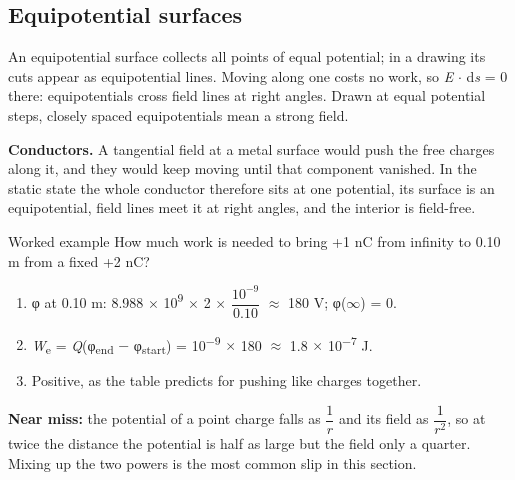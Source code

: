 \documentclass[11pt]{article}
\begin{document}
\begin{keepsection}
\begin{keepsection}
\subsection{Equipotential surfaces}

An equipotential surface collects all points of equal potential; in a drawing its cuts appear as equipotential lines. Moving along one costs no work, so \textit{E} \ensuremath{\cdot} d\textit{s} = 0 there: equipotentials cross field lines at right angles. Drawn at equal potential steps, closely spaced equipotentials mean a strong field.

\textbf{Conductors.} A tangential field at a metal surface would push the free charges along it, and they would keep moving until that component vanished. In the static state the whole conductor therefore sits at one potential, its surface is an equipotential, field lines meet it at right angles, and the interior is field-free.

\begin{workedbox}{Worked example}
How much work is needed to bring +1 nC from infinity to 0.10 m from a fixed +2 nC?

\begin{enumerate}
\item φ at 0.10 m: 8.988 \ensuremath{\times} 10\textsuperscript{9} \ensuremath{\times} 2 \ensuremath{\times} {\small\ensuremath{\dfrac{10^{-9}}{0.10}}} \ensuremath{\approx} 180 V; φ(\ensuremath{\infty}) = 0.
\item \textit{W}\textsubscript{e} = \textit{Q}(φ\textsubscript{end} \ensuremath{-} φ\textsubscript{start}) = 10\textsuperscript{\ensuremath{-}9} \ensuremath{\times} 180 \ensuremath{\approx} 1.8 \ensuremath{\times} 10\textsuperscript{\ensuremath{-}7} J.
\item Positive, as the table predicts for pushing like charges together.
\end{enumerate}
\end{workedbox}

\begin{notebox}\textbf{Near miss:} the potential of a point charge falls as {\small\ensuremath{\dfrac{1}{{r}}}} and its field as {\small\ensuremath{\dfrac{1}{{r}^{2}}}}, so at twice the distance the potential is half as large but the field only a quarter. Mixing up the two powers is the most common slip in this section.\end{notebox}


\end{keepsection}
\end{keepsection}
\end{document}

